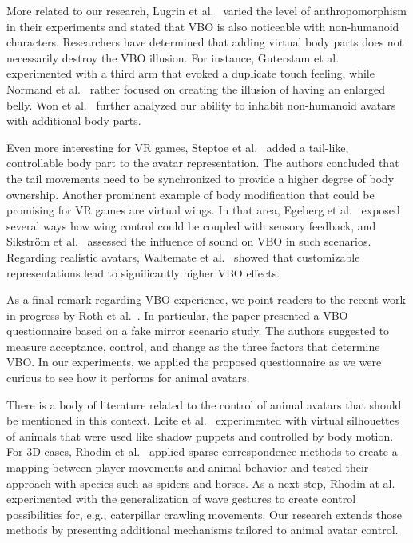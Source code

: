 \documentclass{sigchi-ext}
\begin{document}
More related to our research, Lugrin et al.~\cite{lugrin2015anthropomorphism} varied the level of anthropomorphism in their experiments and stated that VBO is also noticeable with non-humanoid characters. Researchers have determined that adding virtual body parts does not necessarily destroy the VBO illusion. For instance, Guterstam et al.~\cite{guterstam2011illusion} experimented with a third arm that evoked a duplicate touch feeling, while Normand et al.~\cite{normand2011multisensory} rather focused on creating the illusion of having an enlarged belly. Won et al.~\cite{won2015homuncular} further analyzed our ability to inhabit non-humanoid avatars with additional body parts.



Even more interesting for VR games, Steptoe et al.~\cite{steptoe2013human} added a tail-like, controllable body part to the avatar representation. The authors concluded that the tail movements need to be synchronized to provide a higher degree of body ownership. Another prominent example of body modification that could be promising for VR games are virtual wings. In that area, Egeberg et al.~\cite{Egeberg:2016:EHB:2927929.2927940} exposed several ways how wing control could be coupled with sensory feedback, and Sikstr\"om et al.~\cite{sikstrom2014role} assessed the influence of sound on VBO in such scenarios. Regarding realistic avatars, Waltemate et al.~\cite{waltemate2018impact} showed that customizable representations lead to significantly higher VBO effects.

As a final remark regarding VBO experience, we point readers to the recent work in progress by Roth et al.~\cite{roth2017alpha}. In particular, the paper presented a VBO questionnaire based on a fake mirror scenario study. The authors suggested to measure acceptance, control, and change as the three factors that determine VBO. In our experiments, we applied the proposed questionnaire as we were curious to see how it performs for animal avatars.


There is a body of literature related to the control of animal avatars that should be mentioned in this context. Leite et al.~\cite{leite2012shape} experimented with virtual silhouettes of animals that were used like shadow puppets and controlled by body motion. For 3D cases, Rhodin et al.~\cite{rhodin2014interactive} applied sparse correspondence methods to create a mapping between player movements and animal behavior and tested their approach with species such as spiders and horses. As a next step, Rhodin at al.~\cite{rhodin2015generalizing} experimented with the generalization of wave gestures to create control possibilities for, e.g., caterpillar crawling movements. Our research extends those methods by presenting additional mechanisms tailored to animal avatar control.
\end{document}
